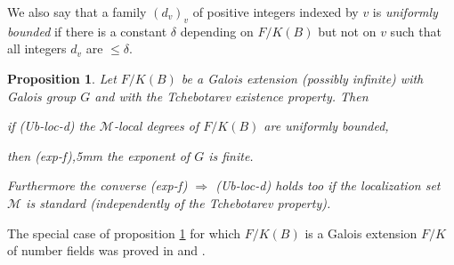 \documentclass[12pt,english]{amsart}
\newtheorem{twisting lemma}[theorem]{Twisting lemma}
\newtheorem{proposition}[theorem]{Proposition}
\begin{document}
We also say that a family $(d_v)_{v}$ of positive integers indexed by $v$ 
is {\it uniformly bounded} if there is a constant $\delta$ depending on $F/K(B)$ but not on $v$ such that all integers $d_v$ are $\leq \delta$.

\begin{proposition} \label{prop:exposant} Let 
 $F/K(B)$ be a Galois extension (possibly infinite)
with Galois group $G$ and with the Tchebotarev existence property. Then 
\vskip 2mm

\noindent
if  \hskip 4mm {\rm (Ub-loc-d)} the ${\mathcal M}$-local degrees of $F/K(B)$ are uniformly bounded, 
\vskip 2mm

\noindent
then  \hskip 1mm {\rm (exp-f)},5mm the exponent of $G$ is finite.
\vskip 2mm

\noindent
Furthermore the converse {\rm (exp-f)} $\Rightarrow$ {\rm (Ub-loc-d)} holds too if the localization set ${\mathcal M}$ is {\it standard}  (independently of the Tchebotarev property).
\end{proposition}

The special case of proposition \ref{prop:exposant} for which $F/K(B)$ is a Galois extension $F/K$ of number fields was 
proved in \cite{ChZa} and \cite{Ch}.
\end{document}
